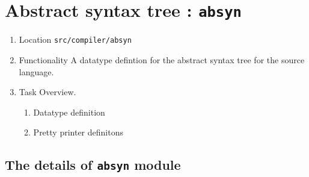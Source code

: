 \documentclass{jbook}
\newif\ifjp
\newcommand{\txt}[2]{#2}
\newcommand{\code}[1]{\mbox{\large\tt #1}}
\begin{document}
\else%
\fi%

% 
\chapter{\txt
{抽象構文木データ構造：\code{absyn}}
{Abstract syntax tree : \code{absyn}}
}
\label{chap:Absyn}

\ifjp%
\begin{enumerate}
\item ソースロケーション \code{src/compiler/absyn}
\item 機能概要 ソース言語の抽象構文木を表現するデータ型
\item 処理概要
\begin{enumerate}
\item 構文木を表すデータ型の定義
\item 構文木プリンタの定義
\end{enumerate}
\item 他モジュールとのインターフェイス
\begin{enumerate}
\item \code{src/compiler/parser2/main/iml.grm} 文法の属性
\item \code{src/compiler/elaborate/main/Elaborator.sml} 構文論的解釈器への入力
\end{enumerate}
\end{enumerate}
\else%
\begin{enumerate}
\item Location
	 \code{src/compiler/absyn}
\item Functionality
	A datatype defintion for the abstract syntax tree for the source
language.
\item Task Overview.
\begin{enumerate}
\item Datatype definition
\item Pretty printer definitons
\end{enumerate}
\end{enumerate}
\fi%

\section{\txt{\code{absyn}モジュールの処理の詳細}{The details of \code{absyn} module}}
\end{document}
